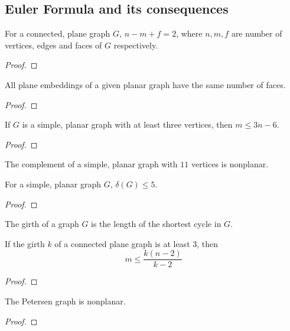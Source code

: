 \subsection{Euler Formula and its consequences}
\begin{theorem}
	For a connected, plane graph $G$, $n - m + f = 2$, where $n,m,f$ are number of vertices, edges and faces of $G$ respectively.
\end{theorem}
\begin{proof}
\end{proof}

\begin{corollary}
	All plane embeddings of a given planar graph have the same number of faces.
\end{corollary}
\begin{proof}
\end{proof}

\begin{corollary}
	If $G$ is a simple, planar graph with at least three vertices, then $m \le 3n-6$.
\end{corollary}
\begin{proof}
\end{proof}

\begin{example}
	The complement of a simple, planar graph with $11$ vertices is nonplanar.
\end{example}

\begin{corollary}
	For a simple, planar graph $G$, $\delta(G) \le 5$.
\end{corollary}
\begin{proof}
\end{proof}

\begin{definition}
	The girth of a graph $G$ is the length of the shortest cycle in $G$.
\end{definition}

\begin{theorem}
	If the girth $k$ of a connected plane graph is at least $3$, then $$m \le \frac{k(n-2)}{k-2}$$
\end{theorem}
\begin{proof}
\end{proof}

\begin{corollary}
	The Petersen graph is nonplanar.
\end{corollary}
\begin{proof}
\end{proof}

